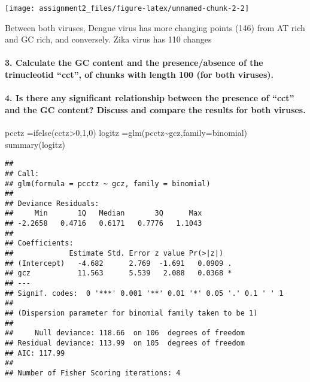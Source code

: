 \documentclass[
]{article}
\newenvironment{Shaded}{\begin{snugshade}}{\end{snugshade}}
\newcommand{\AttributeTok}[1]{\textcolor[rgb]{0.77,0.63,0.00}{#1}}
\newcommand{\DecValTok}[1]{\textcolor[rgb]{0.00,0.00,0.81}{#1}}
\newcommand{\FunctionTok}[1]{\textcolor[rgb]{0.00,0.00,0.00}{#1}}
\newcommand{\NormalTok}[1]{#1}
\newcommand{\OtherTok}[1]{\textcolor[rgb]{0.56,0.35,0.01}{#1}}
\newcommand{\SpecialCharTok}[1]{\textcolor[rgb]{0.00,0.00,0.00}{#1}}
\begin{document}
\begin{center}\texttt{[image: assignment2\_files/figure-latex/unnamed-chunk-2-2]} \end{center}

Between both viruses, Dengue virus has more changing points (146) from
AT rich and GC rich, and conversely. Zika virus has 110 changes

\hypertarget{calculate-the-gc-content-and-the-presenceabsence-of-the-trinucleotid-cct-of-chunks-with-length-100-for-both-viruses.}{%
\paragraph{3. Calculate the GC content and the presence/absence of the
trinucleotid ``cct'', of chunks with length 100 (for both
viruses).}\label{calculate-the-gc-content-and-the-presenceabsence-of-the-trinucleotid-cct-of-chunks-with-length-100-for-both-viruses.}}

\hypertarget{is-there-any-significant-relationship-between-the-presence-of-cct-and-the-gc-content-discuss-and-compare-the-results-for-both-viruses.}{%
\paragraph{4. Is there any significant relationship between the presence
of ``cct'' and the GC content? Discuss and compare the results for both
viruses.}\label{is-there-any-significant-relationship-between-the-presence-of-cct-and-the-gc-content-discuss-and-compare-the-results-for-both-viruses.}}

\begin{Shaded}
\begin{Highlighting}[]
\NormalTok{pcctz }\OtherTok{=}\FunctionTok{ifelse}\NormalTok{(cctz}\SpecialCharTok{\textgreater{}}\DecValTok{0}\NormalTok{,}\DecValTok{1}\NormalTok{,}\DecValTok{0}\NormalTok{)}
\NormalTok{logitz }\OtherTok{=}\FunctionTok{glm}\NormalTok{(pcctz}\SpecialCharTok{\textasciitilde{}}\NormalTok{gcz,}\AttributeTok{family=}\NormalTok{binomial)}
\FunctionTok{summary}\NormalTok{(logitz)}
\end{Highlighting}
\end{Shaded}

\begin{verbatim}
## 
## Call:
## glm(formula = pcctz ~ gcz, family = binomial)
## 
## Deviance Residuals: 
##     Min       1Q   Median       3Q      Max  
## -2.2658   0.4716   0.6171   0.7776   1.1043  
## 
## Coefficients:
##             Estimate Std. Error z value Pr(>|z|)  
## (Intercept)   -4.682      2.769  -1.691   0.0909 .
## gcz           11.563      5.539   2.088   0.0368 *
## ---
## Signif. codes:  0 '***' 0.001 '**' 0.01 '*' 0.05 '.' 0.1 ' ' 1
## 
## (Dispersion parameter for binomial family taken to be 1)
## 
##     Null deviance: 118.66  on 106  degrees of freedom
## Residual deviance: 113.99  on 105  degrees of freedom
## AIC: 117.99
## 
## Number of Fisher Scoring iterations: 4
\end{verbatim}
\end{document}
